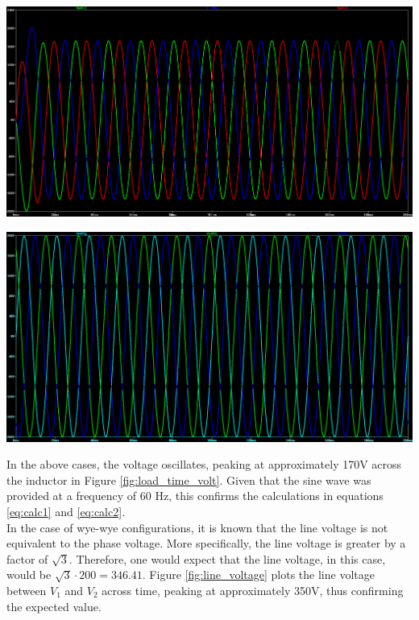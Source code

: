 \documentclass[journal]{IEEEtran}
\begin{document}
\begingroup
    \centering
    \medskip
    \includegraphics[width=\columnwidth]{images/Lab_9_ss_5.PNG}
    \label{fig:load_time_volt}
    \medskip
\endgroup



\begingroup
    \centering
    \medskip
    \includegraphics[width=\columnwidth]{images/Lab_9_ss_6.PNG}
    \label{fig:source_time_volt}
    \medskip
\endgroup

\noindent In the above cases, the voltage oscillates, peaking at approximately 170V across the inductor in Figure \ref{fig:load_time_volt}. Given that the sine wave was provided at a frequency of 60 Hz, this confirms the calculations in equations \ref{eq:calc1} and  \ref{eq:calc2}. \\

\noindent In the case of wye-wye configurations, it is known that the line voltage is not equivalent to the phase voltage. More specifically, the line voltage is greater by a factor of $\sqrt{3}$. Therefore, one would expect that the line voltage, in this case, would be $\sqrt{3}\cdot 200 = 346.41$. Figure \ref{fig:line_voltage} plots the line voltage between $V_{1}$ and $V_{2}$ across time, peaking at approximately 350V,  thus confirming the expected value. \\
\end{document}
